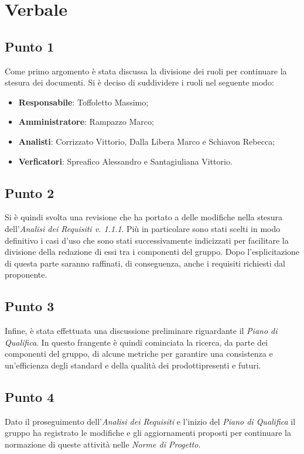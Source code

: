 \section{Verbale}
    \subsection{Punto 1}
        Come primo argomento è stata discussa la divisione dei ruoli per continuare la stesura dei documenti. Si è deciso di suddividere i ruoli nel seguente modo:
        \begin{itemize}
            \item \textbf{Responsabile}: Toffoletto Massimo;
            \item \textbf{Amministratore}: Rampazzo Marco;
            \item \textbf{Analisti}: Corrizzato Vittorio, Dalla Libera Marco e Schiavon Rebecca;
            \item \textbf{Verficatori}: Spreafico Alessandro e Santagiuliana Vittorio. 
        \end{itemize}
    \subsection{Punto 2}
        Si è quindi svolta una revisione che ha portato a delle modifiche nella stesura dell'\textit{Analisi dei Requisiti v. 1.1.1}. Più in particolare sono stati scelti in modo definitivo i casi d'uso che sono stati successivamente indicizzati per facilitare la divisione della redazione di essi tra i componenti del gruppo. Dopo l'esplicitazione di questa parte saranno raffinati, di conseguenza, anche i requisiti richiesti dal proponente.
    \subsection{Punto 3}
        Infine, è stata effettuata una discussione preliminare riguardante il \textit{Piano di Qualifica}. In questo frangente è quindi cominciata la ricerca, da parte dei componenti del gruppo, di alcune metriche per garantire una consistenza e un'efficienza degli standard e della qualità dei prodotti\glosp presenti e futuri.
    \subsection{Punto 4}
        Dato il proseguimento dell'\textit{Analisi dei Requisiti} e l'inizio del \textit{Piano di Qualifica} il gruppo ha registrato le modifiche e gli aggiornamenti proposti per continuare la normazione di queste attività nelle \textit{Norme di Progetto}.
